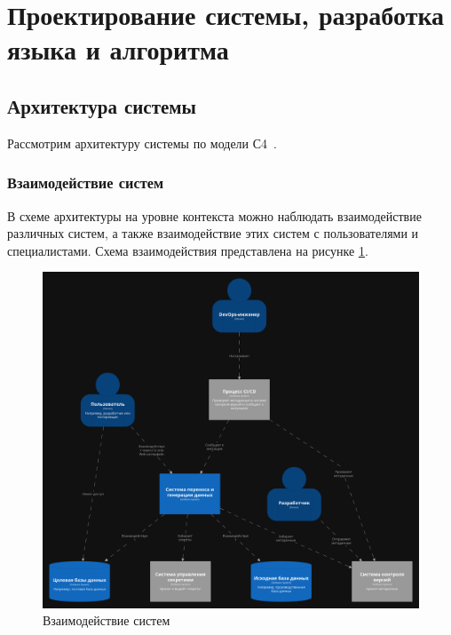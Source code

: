 \section{Проектирование системы, разработка языка и алгоритма}

\subsection{Архитектура системы}

Рассмотрим архитектуру системы по модели С4~\cite{c4-model}.

\subsubsection{Взаимодействие систем}

В схеме архитектуры на уровне контекста можно наблюдать взаимодействие различных систем, а также взаимодействие этих систем с пользователями и специалистами. Схема взаимодействия представлена на рисунке \ref{System Context}.

\begin{figure}
  \includegraphics[scale=0.15]{./img/structurizr-SystemLandscape.png}
  \caption{Взаимодействие систем}
  \label{System Context}
\end{figure}

